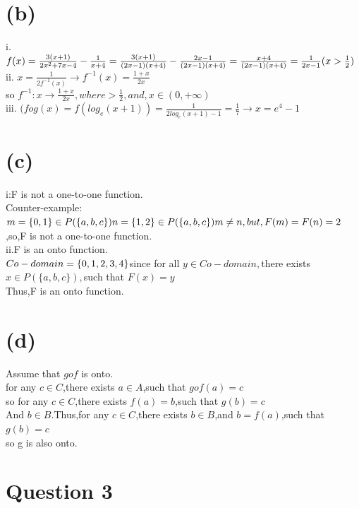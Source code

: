 \documentclass{article}
\begin{document}
\section*{(b)}
i.
\(f(x)=\frac{3(x+1)}{2x^2+7x-4}-\frac{1}{x+4}\\=\frac{3(x+1)}{(2x-1)(x+4)}-\frac{2x-1}{(2x-1)(x+4)}\\=\frac{x+4}{(2x-1)(x+4)}\\=\frac{1}{2x-1}(x>\frac{1}{2})\)\\
ii.
\(x=\frac{1}{2f^{-1}(x)}\longrightarrow f^{-1}(x)=\frac{1+x}{2x}\)\\
so \(f^{-1}:x\longrightarrow \frac{1+x}{2x},where>\frac{1}{2},and,x\in (0,+\infty)\)\\
iii.
\((fog(x)=f(log_{e}(x+1))=\frac{1}{2log_{e}(x+1)-1}=\frac{1}{7}\longrightarrow x=e^4-1\)

\section*{(c)}
i:F is not a one-to-one function.\\
Counter-example:\\
\(m=\{0,1\}\in P(\{a,b,c\})\\n=\{1,2\}\in P(\{a,b,c\})\\m\ne n,but,F(m)=F(n)=2\)
,so,F is not a one-to-one function.\\
ii.F is an onto function.\\
\(Co-domain=\{0,1,2,3,4\}\\\)since for all \(y\in Co-domain,\)there exists \(x\in P(\{a,b,c\}),\)such that \(F(x)=y\)\\Thus,F is an onto function.

\section*{(d)}
Assume that \(gof\) is onto.\\
for any \(c\in C\),there exists \(a\in A\),such that \(gof(a)=c\)\\so for any \(c\in C\),there exists \(f(a)=b\),such that \(g(b)=c\)\\And \(b\in B\).Thus,for any \(c\in C\),there exists \(b\in B\),and \(b=f(a)\),such that \(g(b)=c\)\\
so g is also onto.

\section*{Question 3}
\end{document}
